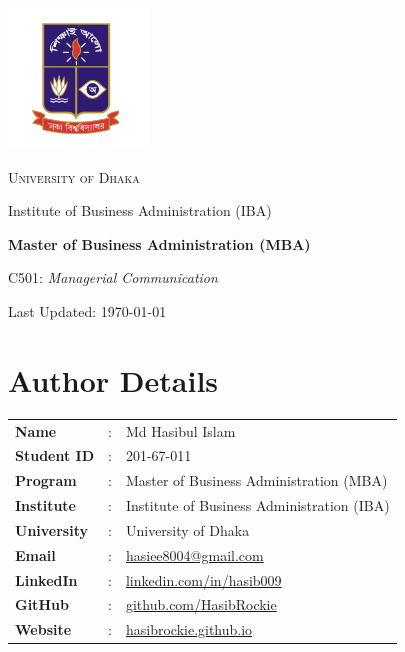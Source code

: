 \documentclass[12pt,a4paper]{book}
\begin{document}
\begin{titlepage}
    \centering
    \vspace*{3.5cm}
    \includegraphics[width=0.28\textwidth]{logo.png}\par\vspace{1.5cm}
    {\scshape\LARGE University of Dhaka\par}
    \vspace{0.5cm}
    {\Large Institute of Business Administration (IBA)\par}
    \vspace{1.5cm}
    {\Huge\bfseries Master of Business Administration (MBA)\par}
    \vspace{1cm}
    {\Large C501: \textit{Managerial Communication}\par}
    \vfill
    {\large Last Updated: \today\par}
\end{titlepage}

\section*{Author Details}
{}

\begin{center}
    \vspace{1em}
    \begin{tabular}{lll}
        \textbf{Name} & : & Md Hasibul Islam \\
        \textbf{Student ID} & : & 201-67-011 \\
        \textbf{Program} & : & Master of Business Administration (MBA) \\
        \textbf{Institute} & : & Institute of Business Administration (IBA) \\
        \textbf{University} & : & University of Dhaka \\
        \textbf{Email} & : & \href{mailto:hasiee8004@gmail.com}{hasiee8004@gmail.com} \\
        \textbf{LinkedIn} & : & \href{https://www.linkedin.com/in/hasib009}{linkedin.com/in/hasib009} \\
        \textbf{GitHub} & : & \href{https://github.com/HasibRockie}{github.com/HasibRockie} \\
        \textbf{Website} & : & \href{https://hasibrockie.github.io}{hasibrockie.github.io} \\
    \end{tabular}
    \vspace{1em}
\end{center}
\end{document}
